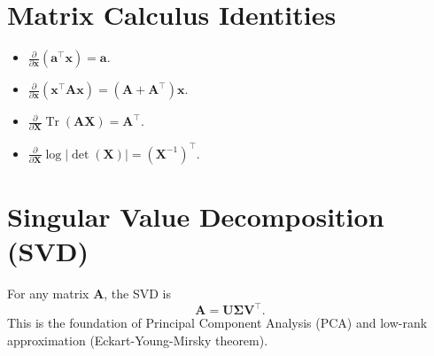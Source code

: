 \documentclass[11pt]{article}
\DeclareMathOperator{\Tr}{Tr}
\begin{document}
\section{Matrix Calculus Identities}
\begin{itemize}
    \item \( \frac{\partial}{\partial \mathbf{x}} (\mathbf{a}^\top \mathbf{x}) = \mathbf{a} \).
    \item \( \frac{\partial}{\partial \mathbf{x}} (\mathbf{x}^\top \mathbf{A} \mathbf{x}) = (\mathbf{A} + \mathbf{A}^\top)\mathbf{x} \).
    \item \( \frac{\partial}{\partial \mathbf{X}} \Tr(\mathbf{A}\mathbf{X}) = \mathbf{A}^\top \).
    \item \( \frac{\partial}{\partial \mathbf{X}} \log |\det(\mathbf{X})| = (\mathbf{X}^{-1})^\top \).
\end{itemize}

\section{Singular Value Decomposition (SVD)}
For any matrix \(\mathbf{A}\), the SVD is
\[
 \mathbf{A} = \mathbf{U} \boldsymbol{\Sigma} \mathbf{V}^\top. 
\]
This is the foundation of Principal Component Analysis (PCA) and low-rank approximation (Eckart-Young-Mirsky theorem).
\end{document}
